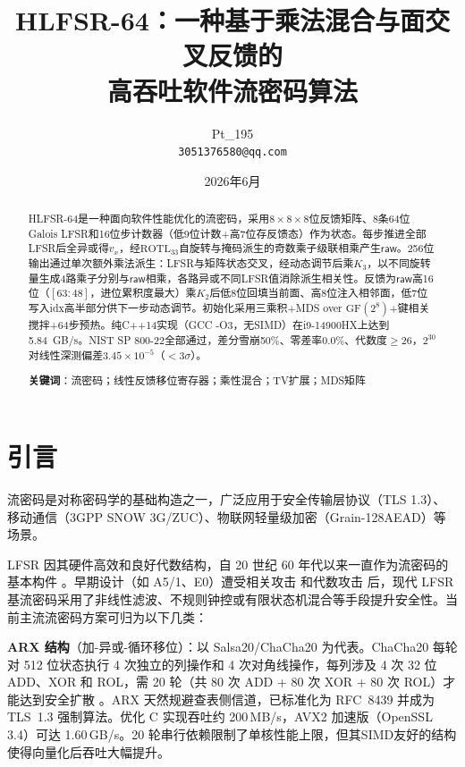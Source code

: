 \documentclass[11pt,a4paper]{ctexart}
\title{HLFSR-64：一种基于乘法混合与面交叉反馈的\\高吞吐软件流密码算法}
\author{Pt\_195\\[2mm]
\small \texttt{3051376580@qq.com}}
\date{2026年6月}
\begin{document}
\maketitle

\begin{abstract}
HLFSR-64是一种面向软件性能优化的流密码，采用$8\times8\times8$位反馈矩阵、8条64位Galois LFSR和16位步计数器（低9位计数+高7位存反馈态）作为状态。每步推进全部LFSR后全异或得$v_x$，经$\mathrm{ROTL}_{33}$自旋转与掩码派生的奇数乘子级联相乘产生$\mathsf{raw}$。256位输出通过单次额外乘法派生：LFSR与矩阵状态交叉，经动态调节后乘$K_3$，以不同旋转量生成4路乘子分别与$\mathsf{raw}$相乘，各路异或不同LFSR值消除派生相关性。反馈为$\mathsf{raw}$高16位（$[63:48]$，进位累积度最大）乘$K_2$后低8位回填当前面、高8位注入相邻面，低7位写入idx高半部分供下一步动态调节。初始化采用三乘积+MDS over $\mathrm{GF}(2^8)$+键相关搅拌+64步预热。纯C++14实现（GCC -O3，无SIMD）在i9-14900HX上达到5.84~GB/s。NIST SP 800-22全部通过，差分雪崩50\%、零差率0.0\%、代数度$\ge 26$，$2^{30}$对线性深测偏差$3.45\times10^{-5}$（$<3\sigma$）。

\textbf{关键词}：流密码；线性反馈移位寄存器；乘性混合；TV扩展；MDS矩阵
\end{abstract}

\section{引言}

流密码是对称密码学的基础构造之一，广泛应用于安全传输层协议（TLS 1.3）、移动通信（3GPP SNOW 3G/ZUC）、物联网轻量级加密（Grain-128AEAD）等场景。

LFSR 因其硬件高效和良好代数结构，自 20 世纪 60 年代以来一直作为流密码的基本构件 \cite{golomb}。早期设计（如 A5/1、E0）遭受相关攻击 \cite{golic} 和代数攻击 \cite{courtois} 后，现代 LFSR 基流密码采用了非线性滤波、不规则钟控或有限状态机混合等手段提升安全性。当前主流流密码方案可归为以下几类：

\textbf{ARX 结构}（加-异或-循环移位）：以 Salsa20/ChaCha20 \cite{chacha} 为代表。ChaCha20 每轮对 512 位状态执行 4 次独立的列操作和 4 次对角线操作，每列涉及 4 次 32 位 ADD、XOR 和 ROL，需 20 轮（共 80 次 ADD + 80 次 XOR + 80 次 ROL）才能达到安全扩散 \cite{chacha}。ARX 天然规避查表侧信道，已标准化为 RFC~8439 并成为 TLS~1.3 强制算法。优化 C 实现吞吐约 200\,MB/s，AVX2 加速版（OpenSSL 3.4）可达 1.60\,GB/s。20 轮串行依赖限制了单核性能上限，但其SIMD友好的结构使得向量化后吞吐大幅提升。
\end{document}
